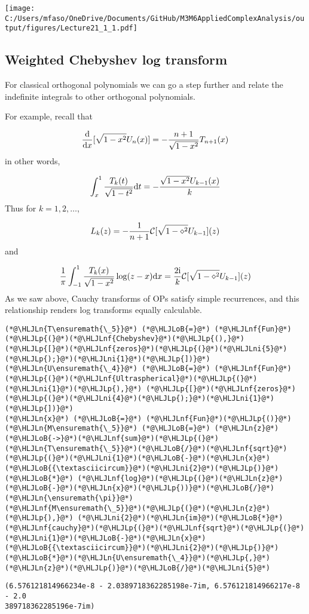 \documentclass[12pt,landscape]{article}
\newcommand{\HLJLn}[1]{#1}
\newcommand{\HLJLnf}[1]{\textcolor[RGB]{66,102,213}{#1}}
\newcommand{\HLJLni}[1]{\textcolor[RGB]{59,151,46}{#1}}
\newcommand{\HLJLoB}[1]{\textcolor[RGB]{102,102,102}{\textbf{#1}}}
\newcommand{\HLJLp}[1]{#1}
\def\D{ {\rm d} }
\def\I{ {\rm i} }
\def\CC{ {\cal C} }
\def\dx{\D x}
\def\dt{\D t}
\begin{document}
{\texttt{[image: C:/Users/mfaso/OneDrive/Documents/GitHub/M3M6AppliedComplexAnalysis/output/figures/Lecture21\_1\_1.pdf]}

\subsection{Weighted Chebyshev log transform}
For classical orthogonal polynomials we can go a step further and relate the indefinite integrals to other orthogonal polynomials.

For example, recall that

\[
{\D\over \dx}[\sqrt{1-x^2} U_n(x)] = -{n+1 \over \sqrt{1-x^2}} T_{n+1}(x)
\]
in other words,

\[
\int_x^1 {T_k(t) \over \sqrt{1-t^2}} \dt = -{\sqrt{1-x^2} U_{k-1}(x) \over k}
\]
Thus for $k=1,2,\ldots$,

\[
L_k(z) = -{1 \over n+1} \CC[\sqrt{1-\diamond^2} U_{k-1}](z)
\]
and

\[
{1 \over \pi} \int_{-1}^1 {T_k(x) \over \sqrt{1-x^2}}\log(z-x) \dx = {2 \I \over k}   \CC[\sqrt{1-\diamond^2} U_{k-1}](z)
\]
As we saw above, Cauchy transforms of OPs satisfy simple recurrences, and this relationship renders log transforms equally calculable.
\newpage
\begin{lstlisting}
(*@\HLJLn{T\ensuremath{\_5}}@*) (*@\HLJLoB{=}@*) (*@\HLJLnf{Fun}@*)(*@\HLJLp{(}@*)(*@\HLJLnf{Chebyshev}@*)(*@\HLJLp{(),}@*) (*@\HLJLp{[}@*)(*@\HLJLnf{zeros}@*)(*@\HLJLp{(}@*)(*@\HLJLni{5}@*)(*@\HLJLp{);}@*)(*@\HLJLni{1}@*)(*@\HLJLp{])}@*)
(*@\HLJLn{U\ensuremath{\_4}}@*) (*@\HLJLoB{=}@*) (*@\HLJLnf{Fun}@*)(*@\HLJLp{(}@*)(*@\HLJLnf{Ultraspherical}@*)(*@\HLJLp{(}@*)(*@\HLJLni{1}@*)(*@\HLJLp{),}@*) (*@\HLJLp{[}@*)(*@\HLJLnf{zeros}@*)(*@\HLJLp{(}@*)(*@\HLJLni{4}@*)(*@\HLJLp{);}@*)(*@\HLJLni{1}@*)(*@\HLJLp{])}@*)
(*@\HLJLn{x}@*) (*@\HLJLoB{=}@*) (*@\HLJLnf{Fun}@*)(*@\HLJLp{()}@*)
(*@\HLJLn{M\ensuremath{\_5}}@*) (*@\HLJLoB{=}@*) (*@\HLJLn{z}@*)(*@\HLJLoB{->}@*)(*@\HLJLnf{sum}@*)(*@\HLJLp{(}@*)(*@\HLJLn{T\ensuremath{\_5}}@*)(*@\HLJLoB{/}@*)(*@\HLJLnf{sqrt}@*)(*@\HLJLp{(}@*)(*@\HLJLni{1}@*)(*@\HLJLoB{-}@*)(*@\HLJLn{x}@*)(*@\HLJLoB{{\textasciicircum}}@*)(*@\HLJLni{2}@*)(*@\HLJLp{)}@*) (*@\HLJLoB{*}@*) (*@\HLJLnf{log}@*)(*@\HLJLp{(}@*)(*@\HLJLn{z}@*)(*@\HLJLoB{-}@*)(*@\HLJLn{x}@*)(*@\HLJLp{))}@*)(*@\HLJLoB{/}@*)(*@\HLJLn{\ensuremath{\pi}}@*)
(*@\HLJLnf{M\ensuremath{\_5}}@*)(*@\HLJLp{(}@*)(*@\HLJLn{z}@*)(*@\HLJLp{),}@*) (*@\HLJLni{2}@*)(*@\HLJLn{im}@*)(*@\HLJLoB{*}@*)(*@\HLJLnf{cauchy}@*)(*@\HLJLp{(}@*)(*@\HLJLnf{sqrt}@*)(*@\HLJLp{(}@*)(*@\HLJLni{1}@*)(*@\HLJLoB{-}@*)(*@\HLJLn{x}@*)(*@\HLJLoB{{\textasciicircum}}@*)(*@\HLJLni{2}@*)(*@\HLJLp{)}@*)(*@\HLJLoB{*}@*)(*@\HLJLn{U\ensuremath{\_4}}@*)(*@\HLJLp{,}@*)(*@\HLJLn{z}@*)(*@\HLJLp{)}@*)(*@\HLJLoB{/}@*)(*@\HLJLni{5}@*)
\end{lstlisting}

\begin{lstlisting}
(6.576121814966234e-8 - 2.0389718362285198e-7im, 6.576121814966217e-8 - 2.0
389718362285196e-7im)
\end{lstlisting}



}
\end{document}
